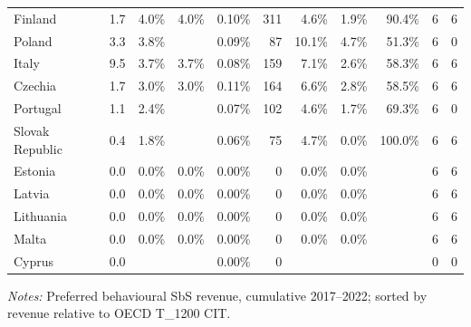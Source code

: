 \begin{table}[H]
\begin{tabular}{@{}lrrrrrrrrrr@{}}
Finland &  1.7 &   4.0\% &   4.0\% &  0.10\% &    311 &   4.6\% &  1.9\% &  90.4\% & 6 & 6 \\
Poland &  3.3 &   3.8\% &  &  0.09\% &     87 &  10.1\% &  4.7\% &  51.3\% & 6 & 0 \\
Italy &  9.5 &   3.7\% &   3.7\% &  0.08\% &    159 &   7.1\% &  2.6\% &  58.3\% & 6 & 6 \\
Czechia &  1.7 &   3.0\% &   3.0\% &  0.11\% &    164 &   6.6\% &  2.8\% &  58.5\% & 6 & 6 \\
Portugal &  1.1 &   2.4\% &  &  0.07\% &    102 &   4.6\% &  1.7\% &  69.3\% & 6 & 0 \\
Slovak Republic &  0.4 &   1.8\% &  &  0.06\% &     75 &   4.7\% &  0.0\% & 100.0\% & 6 & 6 \\
Estonia &  0.0 &   0.0\% &   0.0\% &  0.00\% &      0 &   0.0\% &  0.0\% &  & 6 & 6 \\
Latvia &  0.0 &   0.0\% &   0.0\% &  0.00\% &      0 &   0.0\% &  0.0\% &  & 6 & 6 \\
Lithuania &  0.0 &   0.0\% &   0.0\% &  0.00\% &      0 &   0.0\% &  0.0\% &  & 6 & 6 \\
Malta &  0.0 &   0.0\% &   0.0\% &  0.00\% &      0 &   0.0\% &  0.0\% &  & 6 & 6 \\
Cyprus &  0.0 &  &  &  0.00\% &      0 &  &  &  & 0 & 0 \\
\bottomrule
\end{tabular}

\vspace{0.35em}
\noindent\begin{minipage}{\textwidth}
\footnotesize\raggedright\textit{Notes:} Preferred behavioural SbS revenue, cumulative 2017--2022; sorted by revenue relative to OECD T\_1200 CIT.
\end{minipage}
\end{table}
